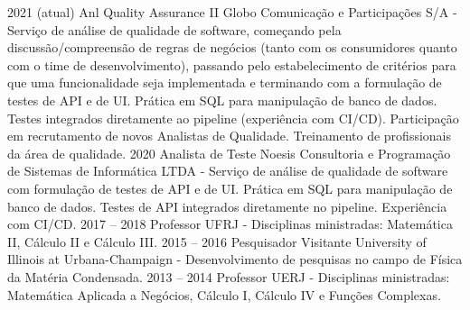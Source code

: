 \documentclass[9pt]{developercv} %
\begin{document}
\begin{entrylist}
	\entry
	{2021 (atual)}%
	{Anl Quality Assurance II}
	{Globo Comunicação e Participações S/A}
	{- Serviço de análise de qualidade de software, começando pela discussão/compreensão de regras de negócios (tanto com os consumidores quanto com o time de desenvolvimento), passando pelo estabelecimento de critérios para que uma funcionalidade seja implementada e terminando com a formulação de testes de API e de UI. Prática em SQL para manipulação de banco de dados. Testes integrados diretamente ao pipeline (experiência com CI/CD). Participação em recrutamento de novos Analistas de Qualidade. Treinamento de profissionais da área de qualidade.}
	\entry
	{2020}%
	{Analista de Teste}
	{Noesis Consultoria e Programação de Sistemas de Informática LTDA}
	{- Serviço de análise de qualidade de software com formulação de testes de API e de UI. Prática em SQL para manipulação de banco de dados. Testes de API integrados diretamente no pipeline. Experiência com CI/CD.}
	\entry
	{2017 -- 2018}
	{Professor}
	{UFRJ}
	{- Disciplinas ministradas: Matemática II, C\'alculo II e C\'alculo III.}
	\entry
	{2015 -- 2016}
	{Pesquisador Visitante}
	{University of Illinois at Urbana-Champaign}
	{- Desenvolvimento de pesquisas no campo de F\'isica da Mat\'eria Condensada.}
	\entry
	{2013 -- 2014}
	{Professor}
	{UERJ}
	{- Disciplinas ministradas: Matemática Aplicada a Negócios, C\'alculo I, C\'alculo IV e Funções Complexas.}
\end{entrylist}

\end{document}
